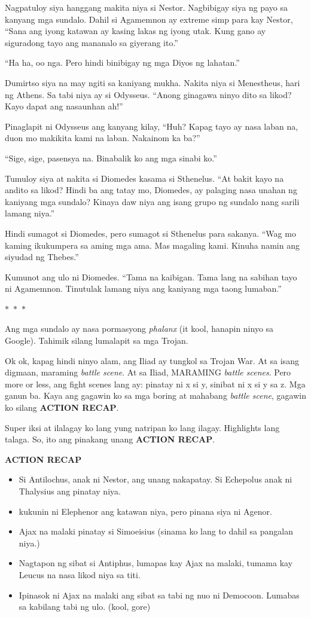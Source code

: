 \documentclass[12pt,letterpaper]{report}
\newenvironment{recap}{\begin{center}{\large\textbf{ACTION RECAP}}\begin{itemize}}{\end{itemize}\end{center}}
\newcommand{\seperate}{\begin{center}$\ast$~$\ast$~$\ast$\end{center}}
\begin{document}
Nagpatuloy siya hanggang makita niya si Nestor. Nagbibigay siya ng payo sa kanyang mga sundalo. Dahil si Agamemnon ay extreme simp para kay Nestor, ``Sana ang iyong katawan ay kasing lakas ng iyong utak. Kung gano ay siguradong tayo ang mananalo sa giyerang ito.''

``Ha ha, oo nga. Pero hindi binibigay ng mga Diyos ng lahatan.''

Dumirtso siya na may ngiti sa kaniyang mukha. Nakita niya si Menestheus, hari ng Athens. Sa tabi niya ay si Odysseus. ``Anong ginagawa ninyo dito sa likod? Kayo dapat ang nasaunhan ah!''

Pinaglapit ni Odysseus ang kanyang kilay, ``Huh? Kapag tayo ay nasa laban na, duon mo makikita kami na laban. Nakainom ka ba?''

``Sige, sige, pasensya na. Binabalik ko ang mga sinabi ko.''

Tumuloy siya at nakita si Diomedes kasama si Sthenelus. ``At bakit kayo na andito sa likod? Hindi ba ang tatay mo, Diomedes, ay palaging nasa unahan ng kaniyang mga sundalo? Kinaya daw niya ang isang grupo ng sundalo nang sarili lamang niya.''

Hindi sumagot si Diomedes, pero sumagot si Sthenelus para sakanya. ``Wag mo kaming ikukumpera sa aming mga ama. Mas magaling kami. Kinuha namin ang siyudad ng Thebes.''

Kumunot ang ulo ni Diomedes. ``Tama na kaibigan. Tama lang na sabihan tayo ni Agamemnon. Tinutulak lamang niya ang kaniyang mga taong lumaban.''

\seperate

Ang mga sundalo ay nasa pormasyong \textit{phalanx} (it kool, hanapin ninyo sa Google). Tahimik silang lumalapit sa mga Trojan.

Ok ok, kapag hindi ninyo alam, ang Iliad ay tungkol sa Trojan War. At sa isang digmaan, maraming \textit{battle scene}. At sa Iliad, MARAMING \textit{battle scenes}. Pero more or less, ang fight scenes lang ay: pinatay ni x si y, sinibat ni x si y sa z. Mga ganun ba. Kaya ang gagawin ko sa mga boring at mahabang \textit{battle scene}, gagawin ko silang \textbf{ACTION RECAP}.

Super iksi at ilalagay ko lang yung natripan ko lang ilagay. Highlights lang talaga. So, ito ang pinakang unang \textbf{ACTION RECAP}.

\begin{recap}
    \item Si Antilochus, anak ni Nestor, ang unang nakapatay. Si Echepolus anak ni Thalysius ang pinatay niya.
    \item kukunin ni Elephenor ang katawan niya, pero pinana siya ni Agenor.
    \item Ajax na malaki pinatay si Simoeisius (sinama ko lang to dahil sa pangalan niya.)
    \item Nagtapon ng sibat si Antiphus, lumapas kay Ajax na malaki, tumama kay Leucus na nasa likod niya sa titi.
    \item Ipinasok ni Ajax na malaki ang sibat sa tabi ng nuo ni Democoon. Lumabas sa kabilang tabi ng ulo. (kool, gore)
\end{recap}
\end{document}
